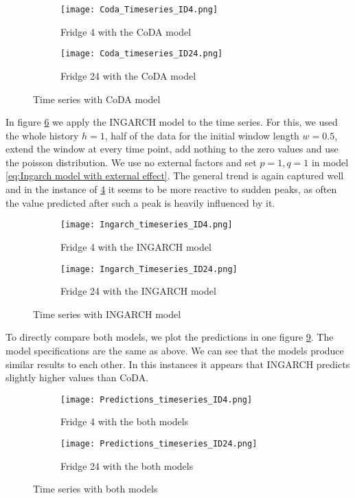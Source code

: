 \begin{figure}[htb]
\centering
\begin{subfigure}[b]{0.45\textwidth}
\texttt{[image: Coda\_Timeseries\_ID4.png]}
\caption{Fridge 4 with the CoDA model}
\label{fig:Coda Fridge 4}
\end{subfigure}
\hfill
\begin{subfigure}[b]{0.45\textwidth}
\texttt{[image: Coda\_timeseries\_ID24.png]}
\caption{Fridge 24 with the CoDA model}
\label{fig:Coda Fridge 24}
\end{subfigure}
\caption{Time series with CoDA model}
\label{fig:TS Coda}
\end{figure}

In figure \ref{fig:TS Ingarch} we apply the INGARCH model to the time series. For this, we used the whole history $h=1$, half of the data for the initial window length $w=0.5$, extend the window at every time point, add nothing to the zero values and use the poisson distribution. We use no external factors and set $p=1, q=1$ in model \ref{eq:Ingarch model with external effect}. The general trend is again captured well and in the instance of \ref{fig:Ingarch Fridge 4} it seems to be more reactive to sudden peaks, as often the value predicted after such a peak is heavily influenced by it.

\begin{figure}[htb]
\centering
\begin{subfigure}[b]{0.45\textwidth}
\texttt{[image: Ingarch\_timeseries\_ID4.png]}
\caption{Fridge 4 with the INGARCH model}
\label{fig:Ingarch Fridge 4}
\end{subfigure}
\hfill
\begin{subfigure}[b]{0.45\textwidth}
\texttt{[image: Ingarch\_Timeseries\_ID24.png]}
\caption{Fridge 24 with the INGARCH model}
\label{fig:Ingarch Fridge 24}
\end{subfigure}
\caption{Time series with INGARCH model}
\label{fig:TS Ingarch}
\end{figure}


To directly compare both models, we plot the predictions in one figure \ref{fig:TS Both}. The model specifications are the same as above. We can see that the models produce similar results to each other. In this instances it appears that INGARCH predicts slightly higher values than CoDA. 

\begin{figure}[htb!]
\centering
\begin{subfigure}[b]{0.8\textwidth}
\texttt{[image: Predictions\_timeseries\_ID4.png]}
\caption{Fridge 4 with the both models}
\label{fig:Both Fridge 4}
\end{subfigure}
\hfill
\begin{subfigure}[b]{0.8\textwidth}
\texttt{[image: Predictions\_timeseries\_ID24.png]}
\caption{Fridge 24 with the both models}
\label{fig:Both Fridge 24}
\end{subfigure}
\caption{Time series with both models}
\label{fig:TS Both}
\end{figure}


